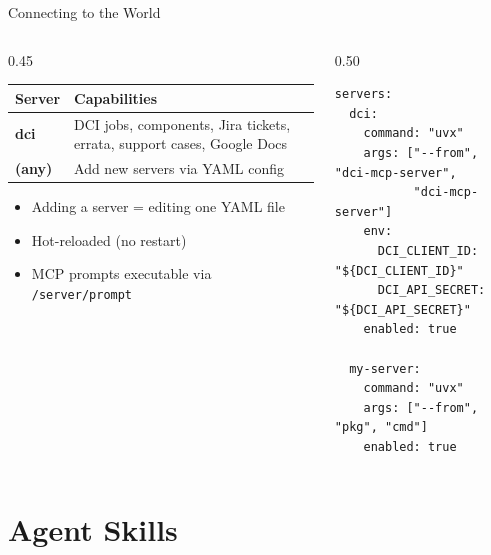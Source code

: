 \documentclass[aspectratio=169,10pt]{beamer}
\begin{document}
\begin{frame}[fragile]{Connecting to the World}
\begin{columns}[T]
\begin{column}{0.45\textwidth}
\begin{table}\scriptsize
\begin{tabular}{@{}lp{3.2cm}@{}}
\toprule
\textbf{Server} & \textbf{Capabilities} \\
\midrule
\textbf{dci} & DCI jobs, components, Jira tickets, errata, support cases, Google Docs \\
\textbf{(any)} & Add new servers via YAML config \\
\bottomrule
\end{tabular}
\end{table}

\smallskip
\begin{itemize}\scriptsize
  \item Adding a server = editing one YAML file
  \item Hot-reloaded (no restart)
  \item MCP prompts executable via \texttt{/server/prompt}
\end{itemize}
\end{column}
\begin{column}{0.50\textwidth}
\begin{lstlisting}[style=yaml,basicstyle=\ttfamily\tiny,title={\scriptsize mcp\_servers.yaml}]
servers:
  dci:
    command: "uvx"
    args: ["--from", "dci-mcp-server",
           "dci-mcp-server"]
    env:
      DCI_CLIENT_ID: "${DCI_CLIENT_ID}"
      DCI_API_SECRET: "${DCI_API_SECRET}"
    enabled: true

  my-server:
    command: "uvx"
    args: ["--from", "pkg", "cmd"]
    enabled: true
\end{lstlisting}
\end{column}
\end{columns}
\end{frame}

\section{Agent Skills}
\end{document}
